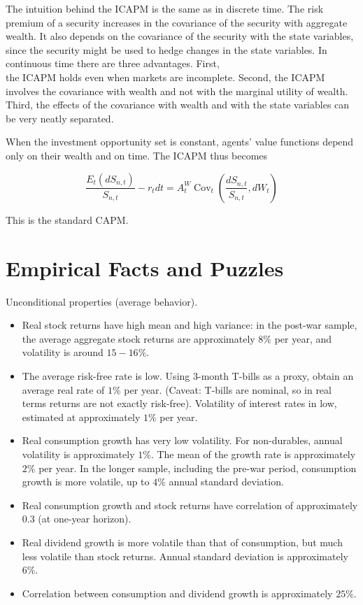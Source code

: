 \documentclass[\topdir/lecture\_notes.tex]{subfiles}
\begin{document}
The intuition behind the ICAPM is the same as in discrete time. The risk premium of a security increases in the covariance of the security with aggregate wealth. It also depends on the covariance of the security with the state variables, since the security might be used to hedge changes in the state variables. In continuous time there are three advantages. First,\\
the ICAPM holds even when markets are incomplete. Second, the ICAPM involves the covariance with wealth and not with the marginal utility of wealth. Third, the effects of the covariance with wealth and with the state variables can be very neatly separated.

When the investment opportunity set is constant, agents' value functions depend only on their wealth and on time. The ICAPM thus becomes

\begin{equation}
\frac{E_{t}\left(d S_{n, t}\right)}{S_{n, t}}-r_{t} d t=A_{t}^{W} \operatorname{Cov}_{t}\left(\frac{d S_{n, t}}{S_{n, t}}, d W_{t}\right) \label{eq:8.2.15}
\end{equation}

This is the standard CAPM.


\section{Empirical Facts and Puzzles}


Unconditional properties (average behavior).

\begin{itemize}
  \item Real stock returns have high mean and high variance: in the post-war sample, the average aggregate stock returns are approximately $8 \%$ per year, and volatility is around $15-16 \%$.
  \item The average risk-free rate is low. Using 3-month T-bills as a proxy, obtain an average real rate of $1 \%$ per year. (Caveat: T-bills are nominal, so in real terms returns are not exactly risk-free). Volatility of interest rates in low, estimated at approximately $1 \%$ per year.
  \item Real consumption growth has very low volatility. For non-durables, annual volatility is approximately $1 \%$. The mean of the growth rate is approximately $2 \%$ per year. In the longer sample, including the pre-war period, consumption growth is more volatile, up to $4 \%$ annual standard deviation.
  \item Real consumption growth and stock returns have correlation of approximately 0.3 (at one-year horizon).
  \item Real dividend growth is more volatile than that of consumption, but much less volatile than stock returns. Annual standard deviation is approximately $6 \%$.
  \item Correlation between consumption and dividend growth is approximately $25 \%$.
\end{itemize}
\end{document}
